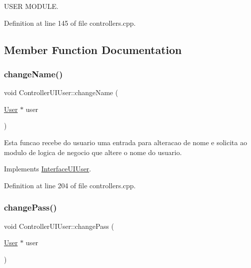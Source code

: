 U\+S\+ER M\+O\+D\+U\+LE. 



Definition at line 145 of file controllers.\+cpp.



\subsection{Member Function Documentation}
\mbox{\label{class_controller_u_i_user_a294982fc334de0b9a520823ff05b545e}} 
\subsubsection{\texorpdfstring{change\+Name()}{changeName()}}
{\footnotesize\ttfamily void Controller\+U\+I\+User\+::change\+Name (\begin{DoxyParamCaption}\item[{\hyperlink{class_user}{User} $\ast$}]{user }\end{DoxyParamCaption})\hspace{0.3cm}{\ttfamily [virtual]}}

Esta funcao recebe do usuario uma entrada para alteracao de nome e solicita ao modulo de logica de negocio que altere o nome do usuario. 

Implements \hyperlink{class_interface_u_i_user_a2d8e9c81dabab905f06eacdc474d928d}{Interface\+U\+I\+User}.



Definition at line 204 of file controllers.\+cpp.

\mbox{\label{class_controller_u_i_user_a769122f009fe45b3c9f4f63afe5c043e}} 
\subsubsection{\texorpdfstring{change\+Pass()}{changePass()}}
{\footnotesize\ttfamily void Controller\+U\+I\+User\+::change\+Pass (\begin{DoxyParamCaption}\item[{\hyperlink{class_user}{User} $\ast$}]{user }\end{DoxyParamCaption})\hspace{0.3cm}{\ttfamily [virtual]}}

